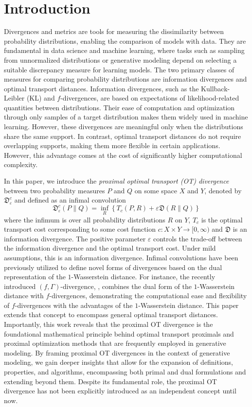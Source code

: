 \documentclass{amsart}
\theoremstyle{definition}
\theoremstyle{remark}
\numberwithin{equation}{section}
\begin{document}
\section{Introduction}
Divergences and metrics are  tools for measuring the dissimilarity between probability distributions, enabling the comparison of models with data. They are fundamental in data science and machine learning, where tasks such as sampling from unnormalized distributions or generative modeling depend on selecting a suitable discrepancy measure for learning models. The two primary classes of measures for comparing probability distributions are information divergences and optimal  transport distances. Information divergences, such as the Kullback-Leibler (KL) and $f$-divergences, are based on expectations of likelihood-related quantities between distributions. Their ease of computation and optimization through only samples of a target distribution makes them widely used in machine learning. However, these divergences are meaningful only when the distributions share the same support. In contrast, optimal transport distances do not require overlapping supports, making them more flexible in certain applications. However, this advantage comes at the cost of significantly higher computational complexity.

In this paper, we introduce the \emph{proximal optimal transport (OT) divergence} between two probability measures $P$ and $Q$ on some space $X$ and $Y$, denoted by $\mathfrak{D}^c_\varepsilon$   and defined as an infimal convolution
\begin{equation}\label{def: for the intro}
\mathfrak{D}^c_\varepsilon(P\|Q) = \inf_{R}\left\{ T_c(P,R) + \varepsilon \mathfrak{D}(R\|Q) \right\}
\end{equation}
where the infimum is over all probability distributions $R$ on $Y$, $T_c$ is the optimal transport cost corresponding to some cost function $c:X\times Y\to[0,\infty)$ and $\mathfrak{D}$ is an information divergence. The positive parameter $\varepsilon$ controls the trade-off between the information divergence and the optimal transport cost. Under mild assumptions, this is an information divergence. Infimal convolutions have been previously utilized to define novel forms of divergences based on the dual representation of the $1$-Wasserstein distance. For instance, the recently introduced $(f,\Gamma)$-divergence, \cite{dupuis2022formulation,birrell2022f}, combines the dual form of the $1$-Wasserstein distance with $f$-divergences, demonstrating the computational ease and flexibility of $f$-divergences with the advantages of the $1$-Wasserstein distance. This paper extends that concept to encompass general optimal transport distances. Importantly, this work reveals that the proximal OT divergence is the foundational mathematical principle behind optimal transport proximals and proximal optimization methods that are frequently employed in generative modeling. By framing proximal OT divergences in the context of generative modeling, we gain deeper insights that allow for the expansion of definitions, properties, and algorithms, encompassing both primal and dual formulations and extending beyond them.  Despite its fundamental role, the proximal OT divergence has not been explicitly introduced as an independent concept until now.
\end{document}

